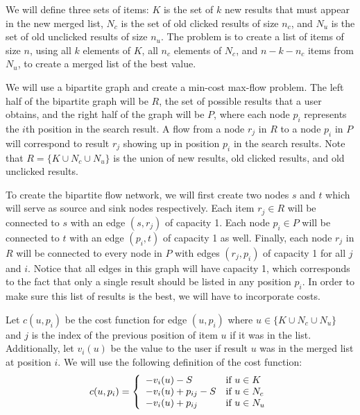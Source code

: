 \documentclass[psamsfonts]{amsart}
\newenvironment{sol}{\vspace{0.25cm}{\large \bfseries Solution:}}{\qedsymbol}
\begin{document}
\begin{sol}
We will define three sets of items: $K$ is the set of $k$ new results that must appear in the new merged list, $N_c$ is the set of old clicked results of size $n_c$, and $N_u$ is the set of old unclicked results of size $n_u$. The problem is to create a list of items of size $n$, using all $k$ elements of $K$, all $n_c$ elements of $N_c$, and $n - k - n_c$ items from $N_u$, to create a merged list of the best value.

We will use a bipartite graph and create a min-cost max-flow problem. The left half of the bipartite graph will be $R$, the set of possible results that a user obtains, and the right half of the graph will be $P$, where each node $p_i$ represents the $i$th position in the search result. A flow from a node $r_j$ in $R$ to a node $p_i$ in $P$ will correspond to result $r_j$ showing up in position $p_i$ in the search results. Note that $R = \{ K \cup N_c \cup N_u \}$ is the union of new results, old clicked results, and old unclicked results.

To create the bipartite flow network, we will first create two nodes $s$ and $t$ which will serve as source and sink nodes respectively. Each item $r_j \in R$ will be connected to $s$ with an edge $(s, r_j)$ of capacity 1. Each node $p_i \in P$ will be connected to $t$ with an edge $(p_i, t)$ of capacity 1 as well. Finally, each node $r_j$ in $R$ will be connected to every node in $P$ with edges $(r_j, p_i)$ of capacity 1 for all $j$ and $i$. Notice that all edges in this graph will have capacity 1, which corresponds to the fact that only a single result should be listed in any position $p_i$. In order to make sure this list of results is the best, we will have to incorporate costs.

Let $c(u,p_i)$ be the cost function for edge $(u, p_i)$ where $u \in \{K \cup N_c \cup N_u \}$ and $j$ is the index of the previous position of item $u$ if it was in the list. Additionally, let $v_i(u)$ be the value to the user if result $u$ was in the merged list at position $i$. We will use the following definition of the cost function:
\begin{eqnarray}
c(u,p_i) = \left\{ \begin{array}{l l}
-v_i(u) - S & \text{if } u \in K \\
-v_i(u) + p_{ij} - S & \text{if } u \in N_c \\
-v_i(u) + p_{ij} & \text{if } u \in N_u 
\end{array} \right.
\end{eqnarray}


\end{sol}
\end{document}
